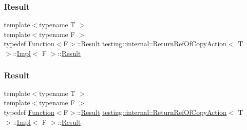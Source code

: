 \mbox{\label{classtesting_1_1internal_1_1_return_ref_of_copy_action_1_1_impl_abb413010cf24f603295ac6426adbe9d0}} 
\subsubsection{\texorpdfstring{Result}{Result}\hspace{0.1cm}{\footnotesize\ttfamily [2/3]}}
{\footnotesize\ttfamily template$<$typename T $>$ \\
template$<$typename F $>$ \\
typedef \mbox{\hyperlink{structtesting_1_1internal_1_1_function}{Function}}$<$F$>$\+::\mbox{\hyperlink{classtesting_1_1_action_interface_a7477de2fe3e4e01c59db698203acaee7}{Result}} \mbox{\hyperlink{classtesting_1_1internal_1_1_return_ref_of_copy_action}{testing\+::internal\+::\+Return\+Ref\+Of\+Copy\+Action}}$<$ T $>$\+::\mbox{\hyperlink{classtesting_1_1internal_1_1_return_ref_of_copy_action_1_1_impl}{Impl}}$<$ F $>$\+::\mbox{\hyperlink{classtesting_1_1_action_interface_a7477de2fe3e4e01c59db698203acaee7}{Result}}}

\mbox{\label{classtesting_1_1internal_1_1_return_ref_of_copy_action_1_1_impl_abb413010cf24f603295ac6426adbe9d0}} 
\subsubsection{\texorpdfstring{Result}{Result}\hspace{0.1cm}{\footnotesize\ttfamily [3/3]}}
{\footnotesize\ttfamily template$<$typename T $>$ \\
template$<$typename F $>$ \\
typedef \mbox{\hyperlink{structtesting_1_1internal_1_1_function}{Function}}$<$F$>$\+::\mbox{\hyperlink{classtesting_1_1_action_interface_a7477de2fe3e4e01c59db698203acaee7}{Result}} \mbox{\hyperlink{classtesting_1_1internal_1_1_return_ref_of_copy_action}{testing\+::internal\+::\+Return\+Ref\+Of\+Copy\+Action}}$<$ T $>$\+::\mbox{\hyperlink{classtesting_1_1internal_1_1_return_ref_of_copy_action_1_1_impl}{Impl}}$<$ F $>$\+::\mbox{\hyperlink{classtesting_1_1_action_interface_a7477de2fe3e4e01c59db698203acaee7}{Result}}}




